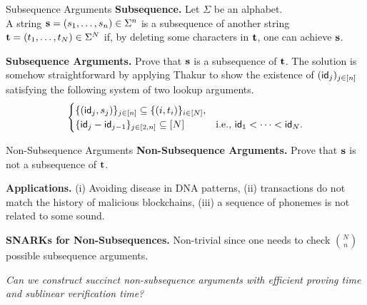 \begin{frame}{Subsequence Arguments}
	\textbf{Subsequence.} Let $\Sigma$ be an alphabet. \\
	A string $\mathbf{s} = (s_1, \dots, s_n) \in \Sigma^n$ is a subsequence of another string $\mathbf{t} = (t_1, \dots, t_N) \in \Sigma^N$ if, by deleting some characters in $\mathbf{t}$, one can achieve $\mathbf{s}$.
	
	\textbf{Subsequence Arguments.} Prove that $\mathbf{s}$ is a subsequence of $\mathbf{t}$. The solution is somehow straightforward by applying Thakur \cite{EPRINT:Thakur23} to show the existence of $(\mathsf{id}_j)_{j \in [n]}$ satisfying the following system of two lookup arguments.
	\begin{equation*}
		\begin{cases}
			\{(\mathsf{id}_j, s_j)\}_{j \in [n]} \subseteq \{(i, t_i)\}_{i \in [N]},\\
			\{\mathsf{id}_j - \mathsf{id}_{j - 1}\}_{j \in [2, n]} \subseteq [N] &\text{i.e., $\mathsf{id}_1 < \dots < \mathsf{id}_N$}.
		\end{cases}
	\end{equation*}
\end{frame}

\begin{frame}{Non-Subsequence Arguments}
	\textbf{Non-Subsequence Arguments.} Prove that $\mathbf{s}$ is not a subsequence of $\mathbf{t}$.
	
	\textbf{Applications.} (i) Avoiding disease in DNA patterns, (ii) transactions do not match the history of malicious blockchains, (iii) a sequence of phonemes is not related to some sound.
	
	\textbf{SNARKs for Non-Subsequences.} Non-trivial since one needs to check $\binom{N}{n}$ possible subsequence arguments.
	
	\pause
	\begin{center}
		\emph{Can we construct succinct non-subsequence arguments with efficient proving time and sublinear verification time?}
	\end{center}
\end{frame}
